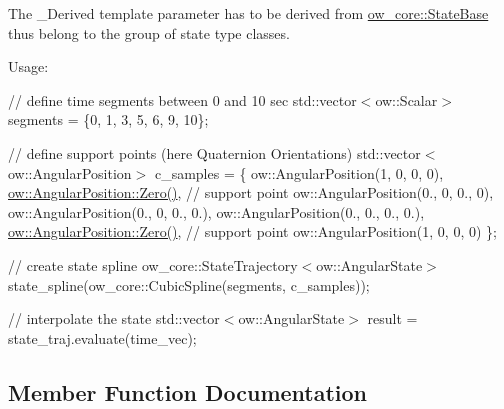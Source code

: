 The \+\_\+\+Derived template parameter has to be derived from \hyperlink{classow__core_1_1StateBase}{ow\+\_\+core\+::\+State\+Base} thus belong to the group of state type classes.

Usage\+:

// define time segments between 0 and 10 sec std\+::vector$<$ow\+::\+Scalar$>$ segments = \{0, 1, 3, 5, 6, 9, 10\};

// define support points (here Quaternion Orientations) std\+::vector$<$ow\+::\+Angular\+Position$>$ c\+\_\+samples = \{ ow\+::\+Angular\+Position(1, 0, 0, 0), \hyperlink{classow__core_1_1AngularPosition_a5e3640999ea9e1543357740870acfeb2}{ow\+::\+Angular\+Position\+::\+Zero()}, // support point ow\+::\+Angular\+Position(0., 0, 0., 0), ow\+::\+Angular\+Position(0., 0, 0., 0.), ow\+::\+Angular\+Position(0., 0., 0., 0.), \hyperlink{classow__core_1_1AngularPosition_a5e3640999ea9e1543357740870acfeb2}{ow\+::\+Angular\+Position\+::\+Zero()}, // support point ow\+::\+Angular\+Position(1, 0, 0, 0) \};

// create state spline ow\+\_\+core\+::\+State\+Trajectory$<$ow\+::\+Angular\+State$>$ state\+\_\+spline(ow\+\_\+core\+::\+Cubic\+Spline(segments, c\+\_\+samples));

// interpolate the state std\+::vector$<$ow\+::\+Angular\+State$>$ result = state\+\_\+traj.\+evaluate(time\+\_\+vec); 

\subsection{Member Function Documentation}
